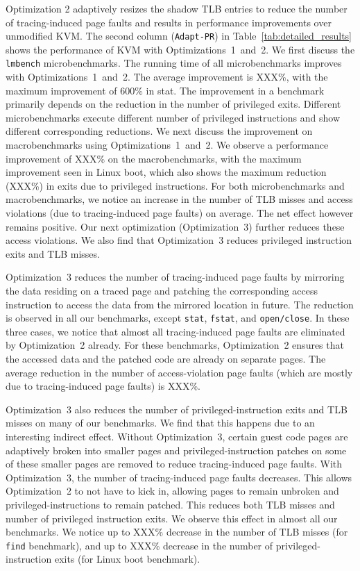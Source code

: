 \documentclass[10pt,twocolumn]{article}
\begin{document}
Optimization 2 adaptively resizes the shadow TLB entries to reduce
the number of tracing-induced page faults and results in
performance improvements over unmodified KVM. The second column ({\tt Adapt-PR})
in Table~\ref{tab:detailed_results} shows the performance of KVM with
Optimizations~1~and~2.
We first discuss the {\tt lmbench} microbenchmarks. The running time
of all microbenchmarks improves with Optimizations~1~and~2. The average improvement
is XXX\%, with the maximum improvement of 600\% in stat. The improvement in
a benchmark primarily depends on the reduction in the number of privileged exits.
Different microbenchmarks execute different number of privileged
instructions and show different corresponding reductions.
We next discuss the improvement on macrobenchmarks using Optimizations~1~and~2.
We observe a performance improvement of XXX\% on the macrobenchmarks, with the
maximum improvement seen in Linux boot, which also shows the maximum reduction
(XXX\%) in exits due to privileged instructions.
For both microbenchmarks and macrobenchmarks, we notice an increase in the
number of TLB misses and access violations (due to tracing-induced page faults)
on average. The net effect however remains positive. Our next
optimization (Optimization~3) further
reduces these access violations. We also find that Optimization~3 reduces
privileged instruction exits and TLB misses.

Optimization~3 reduces the number of tracing-induced page faults
by mirroring the data residing on a traced page and patching the corresponding
access instruction to access the data from the mirrored location in future.
The reduction is observed in all our benchmarks, except {\tt stat}, {\tt fstat},
and {\tt open/close}. In these three cases, we notice that
almost all tracing-induced page faults are eliminated by Optimization~2 already.
For these benchmarks, Optimization~2 ensures that the accessed data and the
patched code are already on separate pages. The average reduction in the number
of access-violation page faults (which are mostly due to tracing-induced
page faults) is XXX\%.

Optimization~3 also reduces the number of privileged-instruction
exits and TLB misses on many of our benchmarks.
We find that this happens due to an interesting indirect effect.
Without Optimization~3, certain guest code pages are adaptively broken into smaller pages
and privileged-instruction patches on some of these smaller pages are removed to reduce
tracing-induced page faults. With Optimization~3, the number of tracing-induced
page faults decreases. This allows Optimization~2 to not have to kick in, allowing
pages to remain unbroken and privileged-instructions to remain patched.
This reduces both TLB misses and number of privileged instruction exits.
We observe this effect in almost all our benchmarks. We notice up to
XXX\% decrease in the number of TLB misses (for {\tt find} benchmark),
and up to XXX\% decrease in the number of privileged-instruction
exits (for Linux boot benchmark).
\end{document}
